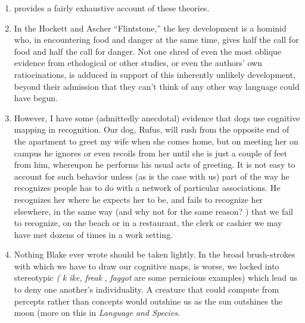 \begin{enumerate}
 
\item \citet{Hewes1975} provides a fairly exhaustive account of these theories.
\item In the Hockett and Ascher ``Flintstone,'' the key development 
is a hominid who, in encountering food and danger at the same time, gives half the call for food and half the call for danger. Not one shred of even the most oblique evidence from ethological or other studies, or even the authors' own ratiocinations, is adduced in support of this inherently unlikely development, beyond their admission that they can't think of any other way language could have begun. 
\item However, I have some (admittedly anecdotal) evidence that 
dogs use cognitive mapping in recognition. Our dog, Rufus, will rush from the opposite end of the apartment to greet my wife when she comes home, but on meeting her on campus he ignores or even recoils from her until she is just a couple of feet from him, whereupon he performs his usual acts of greeting. It is not easy to account for such behavior unless (as is the case with us) part of the way he recognizes people has to do with a network of particular associations. He recog\-nizes her where he expects her to be, and fails to recognize her else\-where, in the same way (and why not for the same reason? ) that we fail to recognize, on the beach or in a restaurant, the clerk or cashier we may have met dozens of times in a work setting. 
\item Nothing Blake ever wrote should be taken lightly. In the 
broad brush-strokes with which we have to draw our cognitive maps, 
is worse, we locked into stereotypic \textit{(} \textit{k} \textit{ike,} \textit{freak} , \textit{faggot} are some pernicious examples) which lead us to deny one another's individuality. A creature that could compute from percepts rather than concepts would out\-shine us as the sun outshines the moon (more on this in \textit{Language and Species}.
 

\end{enumerate}
